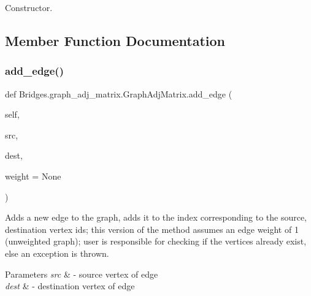 Constructor. 



\subsection{Member Function Documentation}
\mbox{\label{class_bridges_1_1graph__adj__matrix_1_1_graph_adj_matrix_adb4008a308d1fe116ed5a9030c4bf529}} 
\subsubsection{\texorpdfstring{add\+\_\+edge()}{add\_edge()}}
{\footnotesize\ttfamily def Bridges.\+graph\+\_\+adj\+\_\+matrix.\+Graph\+Adj\+Matrix.\+add\+\_\+edge (\begin{DoxyParamCaption}\item[{}]{self,  }\item[{}]{src,  }\item[{}]{dest,  }\item[{}]{weight = {\ttfamily None} }\end{DoxyParamCaption})}



Adds a new edge to the graph, adds it to the index corresponding to the source, destination vertex ids; this version of the method assumes an edge weight of 1 (unweighted graph); user is responsible for checking if the vertices already exist, else an exception is thrown. 


\begin{DoxyParams}{Parameters}
{\em src} & -\/ source vertex of edge \\
\hline
{\em dest} & -\/ destination vertex of edge \\
\hline
\end{DoxyParams}
\mbox{\label{class_bridges_1_1graph__adj__matrix_1_1_graph_adj_matrix_ae769e1dd93d9d1f5aabb09560c65c418}} 
